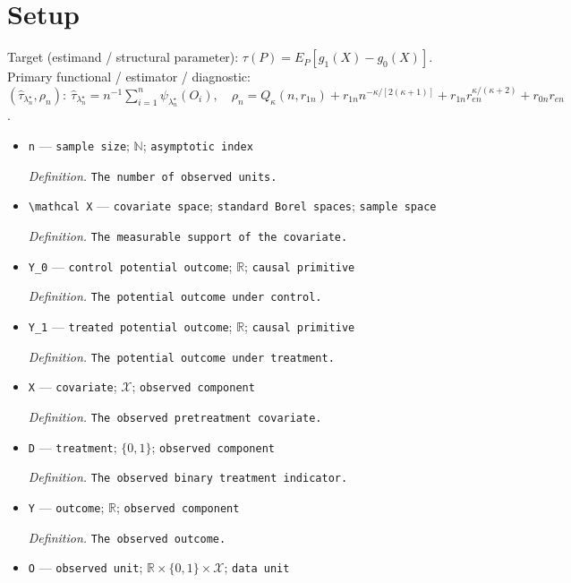\documentclass{article}
\begin{document}
\section{Setup}

Target (estimand / structural parameter): \(\tau(P)=E_P[g_1(X)-g_0(X)]\).
Primary functional / estimator / diagnostic: \((\widehat\tau_{\lambda_n^{\star}},\rho_n):\ \widehat\tau_{\lambda_n^{\star}}=n^{-1}\sum_{i=1}^n\psi_{\lambda_n^{\star}}(O_i),\quad \rho_n=Q_{\kappa}(n,r_{1n})+r_{1n}n^{-\kappa/[2(\kappa+1)]}+r_{1n}r_{en}^{\kappa/(\kappa+2)}+r_{0n}r_{en}\).
\begin{itemize}
  \item \texttt{n} --- \texttt{sample size}; \(\mathbb N\); \texttt{asymptotic index}
  \par\smallskip\noindent\emph{Definition.} \texttt{The number of observed units.}
  \item \texttt{\textbackslash{}\allowbreak{}mathcal X} --- \texttt{covariate space}; \texttt{standard Borel spaces}; \texttt{sample space}
  \par\smallskip\noindent\emph{Definition.} \texttt{The measurable support of the covariate.}
  \item \texttt{Y\_\allowbreak{}0} --- \texttt{control potential outcome}; \(\mathbb R\); \texttt{causal primitive}
  \par\smallskip\noindent\emph{Definition.} \texttt{The potential outcome under control.}
  \item \texttt{Y\_\allowbreak{}1} --- \texttt{treated potential outcome}; \(\mathbb R\); \texttt{causal primitive}
  \par\smallskip\noindent\emph{Definition.} \texttt{The potential outcome under treatment.}
  \item \texttt{X} --- \texttt{covariate}; \(\mathcal X\); \texttt{observed component}
  \par\smallskip\noindent\emph{Definition.} \texttt{The observed pretreatment covariate.}
  \item \texttt{D} --- \texttt{treatment}; \(\{0,1\}\); \texttt{observed component}
  \par\smallskip\noindent\emph{Definition.} \texttt{The observed binary treatment indicator.}
  \item \texttt{Y} --- \texttt{outcome}; \(\mathbb R\); \texttt{observed component}
  \par\smallskip\noindent\emph{Definition.} \texttt{The observed outcome.}
  \item \texttt{O} --- \texttt{observed unit}; \(\mathbb R\times\{0,1\}\times\mathcal X\); \texttt{data unit}

\end{itemize}
\end{document}
